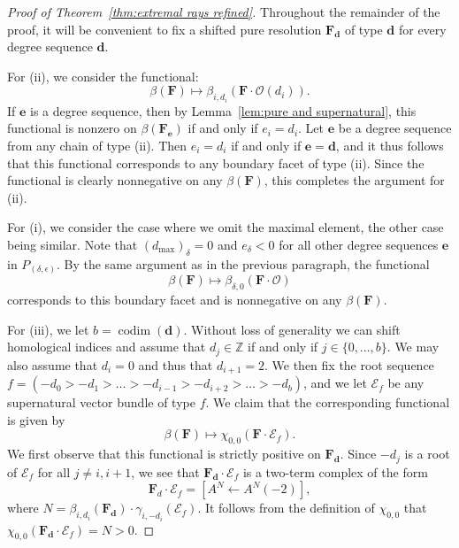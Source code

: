 \documentclass[12pt]{amsart}
\theoremstyle{definition}
\theoremstyle{remark}
\newcommand{\codim}{\operatorname{codim}}
\newcommand{\ZZ}{\mathbb{Z}}
\newcommand{\dd}{\mathbf{d}}
\newcommand{\ee}{\mathbf{e}}
\newcommand{\cO}{\mathcal{O}}
\newcommand{\cE}{\mathcal{E}}
\newcommand{\FF}{\mathbf{F}}
\begin{document}
\begin{proof}[Proof of Theorem~\ref{thm:extremal rays refined}]
Throughout the remainder of the proof, it will be convenient to fix a shifted pure resolution $\FF_{\dd}$ of type $\dd$ for every  degree sequence $\dd$.


For (ii), we consider the functional:
\[
\beta(\FF)\mapsto \beta_{i,{d_i}}(\FF\cdot \cO(d_i)).
\]
If $\ee$ is a degree sequence, then by Lemma~\ref{lem:pure and supernatural}, this functional is nonzero on $\beta(\FF_{\ee})$ if and only if $e_i=d_i$.
Let $\ee$ be a degree sequence from any chain of type (ii).  Then $e_i=d_i$ if and only if $\ee=\dd$, and it thus follows that this functional corresponds to any boundary facet of type (ii).  Since the functional is clearly nonnegative on any $\beta(\FF)$, this completes the argument for (ii).

For (i), we consider the case where we omit the maximal element, the other case being similar.  Note that $(d_{\max})_{\delta}=0$ and $e_{\delta}<0$ for all other degree sequences $\ee$ in $P_{(\delta,\epsilon)}$.  By the same argument as in the previous paragraph, the functional 
\[
\beta(\FF)\mapsto \beta_{\delta,0}(\FF\cdot \cO)
\]
corresponds to this boundary facet and is nonnegative on any $\beta(\FF)$.

For (iii), we let $b=\codim(\dd)$.  Without loss of generality we can shift homological indices and assume that $d_j\in \ZZ$ if and only if $j\in \{0, \dots, b\}$.   We may also assume that $d_i=0$ and thus that $d_{i+1}=2$.  We then fix the root sequence $f=(-d_0>-d_1>\dots >-d_{i-1}>-d_{i+2}>\dots >-d_{b})$, and we let $\cE_f$ be any supernatural vector bundle of type $f$.  We claim that the corresponding functional is given by
\begin{equation}\label{eqn:caseiii}
\beta(\FF) \mapsto \chi_{0,0}(\FF\cdot \cE_f).
\end{equation}
We first observe that this functional is strictly positive on $\FF_{\dd}$.  Since $-d_j$ is a root of $\cE_f$ for all $j\ne i,i+1$, we see that $\FF_{\dd}\cdot \cE_f$ is a two-term complex of the form
\[
\FF_d\cdot \cE_f=\left[ A^N \gets A^N(-2)\right],
\]
where $N=\beta_{i,d_i}(\FF_{\dd})\cdot \gamma_{i,-d_i}(\cE_f)$.  It follows from the definition of $\chi_{0,0}$ that $\chi_{0,0}(\FF_{\dd}\cdot \cE_f)=N>0$.  


\end{proof}
\end{document}
